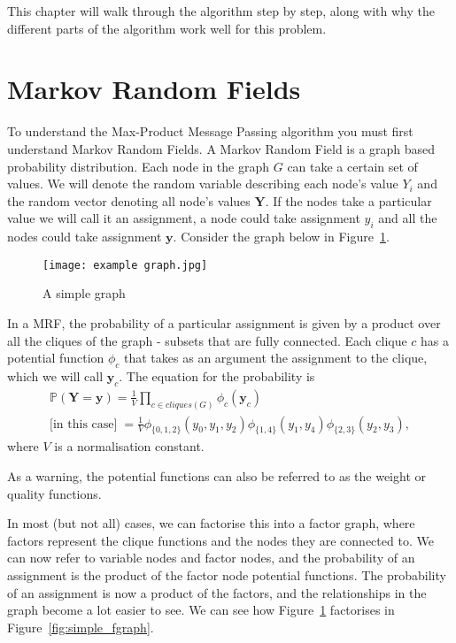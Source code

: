 This chapter will walk through the algorithm step by step, along with why the different parts of the algorithm work well for this problem.

\section{Markov Random Fields}
\label{sec:mrfs}
To understand the Max-Product Message Passing algorithm you must first understand Markov Random Fields.
A Markov Random Field is a graph based probability distribution.
Each node in the graph $G$ can take a certain set of values.
We will denote the random variable describing each node's value $Y_i$ and the random vector denoting all node's values $\mathbf{Y}$.
If the nodes take a particular value we will call it an assignment, a node could take assignment $y_i$ and all the nodes could take assignment $\mathbf{y}$.
Consider the graph below in Figure~\ref{fig:simple_graph}.

\begin{figure}[h]
    \centering
    \texttt{[image: example graph.jpg]}
    \caption{A simple graph}
    \label{fig:simple_graph}
\end{figure}

In a MRF, the probability of a particular assignment is given by a product over all the cliques of the graph - subsets that are fully connected.
Each clique $c$ has a potential function $\phi_c$ that takes as an argument the assignment to the clique, which we will call $\mathbf{y}_c$.
The equation for the probability is
\begin{gather}
    \mathbb{P}(\mathbf{Y} = \mathbf{y}) = \frac{1}{V} \prod_{c \in cliques(G)} \phi_c (\mathbf{y}_c) \label{eq:mrf} \\
    \text{[in this case]}\; = \frac{1}{V} \phi_{\{0, 1, 2\}}(y_0, y_1, y_2) \phi_{\{1, 4\}}(y_1, y_4) \phi_{\{2, 3\}}(y_2, y_3),
\end{gather}
where $V$ is a normalisation constant.

As a warning, the potential functions can also be referred to as the weight or quality functions.

In most (but not all) cases, we can factorise this into a factor graph, where factors represent the clique functions and the nodes they are connected to.
We can now refer to variable nodes and factor nodes, and the probability of an assignment is the product of the factor node potential functions.
The probability of an assignment is now a product of the factors, and the relationships in the graph become a lot easier to see.
We can see how Figure~\ref{fig:simple_graph} factorises in Figure~\ref{fig:simple_fgraph}.

